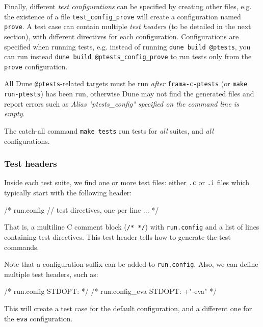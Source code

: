 Finally, different {\em test configurations} can be specified by creating
other files, e.g. the existence of a file \verb|test_config_prove| will
create a configuration named \verb|prove|. A test case can contain multiple
{\em test headers} (to be detailed in the next section), with different
directives for each configuration. Configurations are specified
when running tests, e.g. instead of running \verb|dune build @ptests|,
you can run instead \verb|dune build @ptests_config_prove| to run tests only
from the \verb|prove| configuration.

\begin{important}
  All Dune \verb|@ptests|-related targets must be run {\em after}
  \verb|frama-c-ptests| (or \verb|make run-ptests|) has been run, otherwise
  Dune may not find the generated files and report errors such as
  {\em Alias "ptests\_config" specified on the command line is empty}.
\end{important}

The catch-all command \verb|make tests| run tests for {\em all} suites, and
{\em all} configurations.

\subsubsection{Test headers}\label{ptests:header}

Inside each test suite, we find one or more test files: either \verb|.c|
or \verb|.i| files which typically start with the following
header:

\begin{listing-nonumber}
/* run.config
  // test directives, one per line
  ...
*/
\end{listing-nonumber}

That is, a multiline C comment block (\verb|/* */|) with \verb|run.config|
and a list of lines containing test directives. This test header
tells \ptests how to generate the test commands.

Note that a configuration suffix can be added to \verb|run.config|. Also,
we can define multiple test headers, such as:

\begin{listing-nonumber}
/* run.config
  STDOPT:
*/
/* run.config_eva
  STDOPT: +"-eva"
*/
\end{listing-nonumber}

This will create a test case for the default configuration, and a different one
for the \verb|eva| configuration.


